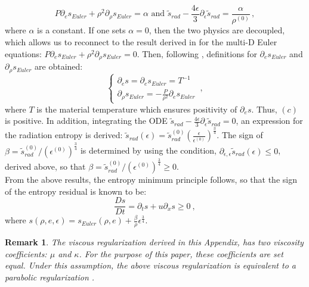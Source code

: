 \documentclass[review]{elsarticle}
\newtheorem{remark}{Remark}[section]
\begin{document}
\begin{appendices}
 \begin{equation}
 P \partial_e s_{Euler} + \rho^2 \partial_{\rho} s_{Euler} = \alpha \text{  and  } \tilde{s}_{rad} - \frac{4\epsilon}{3} \partial_{\epsilon} \tilde{s}_{rad} = \frac{\alpha}{\rho^{(0)}}  \,,
 \end{equation}
 where $\alpha$ is a constant. If one sets $\alpha=0$, then the two physics are decoupled, which allows us to reconnect to the result derived in \cite{jlg} for the multi-D Euler equations: $P \partial_e s_{Euler} + \rho^2 \partial_{\rho} s_{Euler} = 0$. Then, following \cite{jlg}, definitions for $\partial_e s_{Euler}$ and $\partial_{\rho} s_{Euler}$ are obtained:
 \begin{equation}
 \label{eq:definition}
 \left\{
 \begin{array}{ll}
 \partial_e s = \partial_e s_{Euler} = T^{-1} \nonumber\\
 \partial_{\rho} s_{Euler} = -\frac{P}{\rho^2} \partial_e s_{Euler}
 \end{array}
 \right.  \,,
 \end{equation} 
 where $T$ is the material temperature which ensures positivity of $\partial_e s$. Thus, $(c)$ is positive. In addition, integrating the ODE $\tilde{s}_{rad} - \frac{4\epsilon}{3} \partial_{\epsilon} \tilde{s}_{rad} = 0$, an expression for the radiation entropy is derived: $\tilde{s}_{rad}(\epsilon)  = \tilde{s}_{rad}^{(0)} \left(\frac{\epsilon}{\epsilon^{(0)}}\right)^\frac{3}{4}$. The sign of $\beta = \tilde{s}_{rad}^{(0)} / \left(\epsilon^{(0)}\right)^\frac{3}{4}$ is determined by using the condition, $\partial_{\epsilon,\epsilon} \tilde{s}_{rad}(\epsilon) \leq 0$, derived above, so that $\beta = \tilde{s}_{rad}^{(0)} / \left(\epsilon^{(0)}\right)^\frac{3}{4}\geq0$.\\
From the above results, the entropy minimum principle follows, so that the sign of the entropy residual is known to be:
\begin{equation}
\boxed{\frac{Ds}{Dt} = \partial_t s + u \partial_x s \geq 0} \ ,
\end{equation}
where $s\left( \rho, e, \epsilon \right) = s_{Euler}( \rho, e) + \frac{\beta}{\rho} \epsilon^\frac{3}{4}$. %
\begin{remark}
The viscous regularization derived in this Appendix, has two viscosity coefficients: $\mu$ and $\kappa$. For the purpose of this paper, these coefficients are set equal. Under this assumption, the above viscous regularization is equivalent to a parabolic regularization  \cite{Parabolic}.
\end{remark}


\end{appendices}
\end{document}
